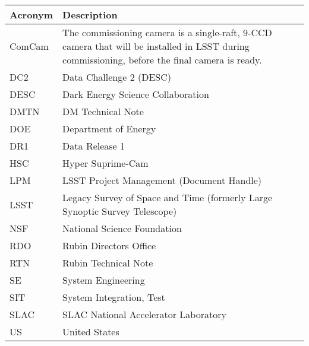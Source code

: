\addtocounter{table}{-1}
\begin{longtable}{p{}p{}}\hline
\textbf{Acronym} & \textbf{Description}  \\\hline

ComCam & The commissioning camera is a single-raft, 9-CCD camera that will be installed in LSST during commissioning, before the final camera is ready. \\\hline
DC2 & Data Challenge 2 (DESC) \\\hline
DESC & Dark Energy Science Collaboration \\\hline
DMTN & DM Technical Note \\\hline
DOE & Department of Energy \\\hline
DR1 & Data Release 1 \\\hline
HSC & Hyper Suprime-Cam \\\hline
LPM & LSST Project Management (Document Handle) \\\hline
LSST & Legacy Survey of Space and Time (formerly Large Synoptic Survey Telescope) \\\hline
NSF & National Science Foundation \\\hline
RDO & Rubin Directors Office \\\hline
RTN & Rubin Technical Note \\\hline
SE & System Engineering \\\hline
SIT & System Integration, Test \\\hline
SLAC & SLAC National Accelerator Laboratory \\\hline
US & United States \\\hline
\end{longtable}
